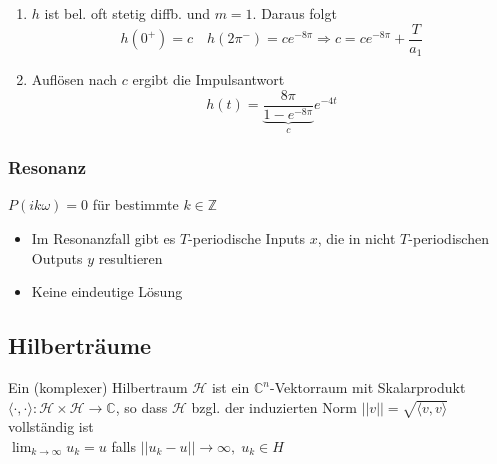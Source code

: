 \begin{sectionbox}
\begin{itemize}
\begin{enumerate}
                  \item $h$ ist bel. oft stetig diffb. und $m=1$. Daraus folgt \begin{equation*}
                            h(0^+)=c \quad h(2\pi^-)=ce^{-8\pi} \Rightarrow c=ce^{-8\pi}+\frac{T}{a_1}
                        \end{equation*}
                  \item Auflösen nach $c$ ergibt die Impulsantwort \begin{equation*}
                            h(t) = \underbrace{\frac{8\pi}{1-e^{-8\pi}}}_c e^{-4t}
                        \end{equation*}
              \end{enumerate}
    \end{itemize}
\end{sectionbox}

\begin{sectionbox}
    \subsubsection{Resonanz}
    $P(ik\omega) = 0$ für bestimmte $k\in\mathbb Z$
    \begin{itemize}
        \item Im Resonanzfall gibt es $T$-periodische Inputs $x$, die in nicht $T$-periodischen Outputs $y$ resultieren
        \item Keine eindeutige Lösung
    \end{itemize}
\end{sectionbox}


\subsection{Hilberträume}
\begin{emphbox}
    Ein (komplexer) Hilbertraum $\mathcal H$ ist ein $\mathbb C^n$-Vektorraum mit Skalarprodukt $\langle \cdot, \cdot \rangle : \mathcal H \times \mathcal H \rightarrow \mathbb C$, so dass $\mathcal H$ bzgl. der induzierten Norm $||v|| = \sqrt{\langle v,v\rangle}$ vollständig ist \\
    $\lim_{k\rightarrow\infty}u_k = u$ falls $||u_k-u||\rightarrow\infty, \; u_k\in H$
\end{emphbox}

